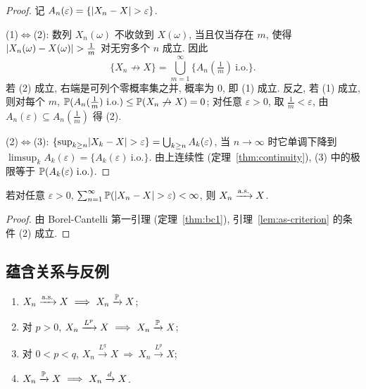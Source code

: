 \begin{proof}
记 $A_n(\varepsilon)=\{\lvert X_n-X\rvert>\varepsilon\}$.

(1)$\Leftrightarrow$(2): 数列 $X_n(\omega)$ 不收敛到 $X(\omega)$, 当且仅当存在 $m$, 使得 $\lvert X_n(\omega)-X(\omega)\rvert>\frac{1}{m}$ 对无穷多个 $n$ 成立. 因此
\[
\{X_n\not\to X\}=\bigcup_{m=1}^\infty\big\{A_n(\tfrac{1}{m})\ \text{i.o.}\big\}.
\]
若 (2) 成立, 右端是可列个零概率集之并, 概率为 $0$, 即 (1) 成立. 反之, 若 (1) 成立, 则对每个 $m$, $\P(A_n(\frac{1}{m})\ \text{i.o.})\le\P(X_n\not\to X)=0$; 对任意 $\varepsilon>0$, 取 $\frac{1}{m}<\varepsilon$, 由 $A_n(\varepsilon)\subseteq A_n(\frac{1}{m})$ 得 (2).

(2)$\Leftrightarrow$(3): $\{\sup_{k\ge n}\lvert X_k-X\rvert>\varepsilon\}=\bigcup_{k\ge n}A_k(\varepsilon)$, 当 $n\to\infty$ 时它单调下降到 $\limsup_k A_k(\varepsilon)=\{A_k(\varepsilon)\ \text{i.o.}\}$. 由上连续性 (定理~\ref{thm:continuity}), (3) 中的极限等于 $\P(A_k(\varepsilon)\ \text{i.o.})$.
\end{proof}

\begin{corollary}[快速收敛判别法]\label{cor:fast-convergence}
若对任意 $\varepsilon>0$, $\sum_{n=1}^\infty\mathbb{P}(\lvert X_n-X\rvert>\varepsilon)<\infty$, 则 $X_n\xrightarrow{\text{a.s.}}X$.
\end{corollary}

\begin{proof}
由 Borel-Cantelli 第一引理 (定理~\ref{thm:bc1}), 引理~\ref{lem:as-criterion} 的条件 (2) 成立.
\end{proof}

\subsection{蕴含关系与反例}

\begin{theorem}[收敛模式的蕴含关系]\label{thm:convergence-implications}
\begin{enumerate}
\item $X_n\xrightarrow{\as}X\ \Longrightarrow\ X_n\xrightarrow{\P}X$;
\item 对 $p>0$, $X_n\xrightarrow{L^p}X\ \Longrightarrow\ X_n\xrightarrow{\P}X$;
\item 对 $0<p<q$, $X_n\xrightarrow{L^q}X\ \Longrightarrow\ X_n\xrightarrow{L^p}X$;
\item $X_n\xrightarrow{\P}X\ \Longrightarrow\ X_n\xrightarrow{d}X$.
\end{enumerate}
\end{theorem}

